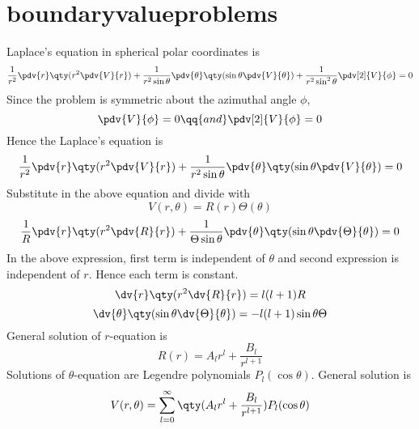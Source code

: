 \section*{boundaryvalueproblems}
Laplace's equation in spherical polar coordinates is 
\[\frac{1}{r^2}\pdv{r}\qty(r^2\pdv{V}{r})+\frac{1}{r^2\sin\theta}\pdv{\theta}\qty(\sin\theta\pdv{V}{\theta})+\frac{1}{r^2\sin^2\theta}\pdv[2]{V}{\phi}=0\]
Since the problem is symmetric about the azimuthal angle $\phi$, \[\pdv{V}{\phi}=0\qq{and}\pdv[2]{V}{\phi}=0\]
Hence the Laplace's equation is 
\[\frac{1}{r^2}\pdv{r}\qty(r^2\pdv{V}{r})+\frac{1}{r^2\sin\theta}\pdv{\theta}\qty(\sin\theta\pdv{V}{\theta})=0\]
Substitute in the above equation and divide with \[V(r,\theta)=R(r)\Theta(\theta)\]  
\[\frac{1}{R}\pdv{r}\qty(r^2\pdv{R}{r})+\frac{1}{\Theta\sin\theta}\pdv{\theta}\qty(\sin\theta\pdv{\Theta}{\theta})=0\]
In the above expression, first term is independent of $\theta$ and second expression is independent of $r$. Hence each term is constant.
\[\dv{r}\qty(r^2\dv{R}{r})=l(l+1)R\]
\[\dv{\theta}\qty(\sin\theta\dv{\Theta}{\theta})=-l(l+1)\sin\theta\Theta\]
General solution of $r$-equation is 
\[R(r)=A_lr^l+\frac{B_l}{r^{l+1}}\]
Solutions of $\theta$-equation are Legendre polynomials $P_l(\cos\theta)$. 
General solution is \[V(r,\theta)=\sum_{l=0}^{\infty}\qty(A_lr^l+\frac{B_l}{r^{l+1}})P_l(\cos\theta)\]
